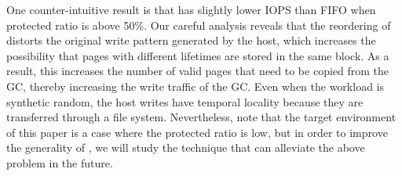 One counter-intuitive result is that \ours{} has slightly lower IOPS than FIFO when protected ratio is above 50\%. Our careful analysis reveals that the reordering of \ours{} distorts the original write pattern generated by the host, which increases the possibility that pages with different lifetimes are stored in the same block. As a result, this increases the number of valid pages that need to be copied from the GC, thereby increasing the write traffic of the GC. Even when the workload is synthetic random, the host writes have temporal locality because they are transferred through a file system. 
Nevertheless, note that the target environment of this paper is a case where the protected ratio is low, but in order to improve the generality of \ours{}, we will study the technique that can alleviate the above problem in the future.





%



